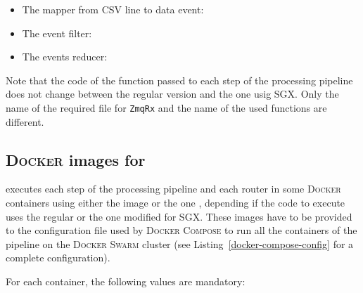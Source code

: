 \begin{itemize}[leftmargin=*]
  \item The mapper from \textsc{CSV} line to data event:
    
  \item The event filter:
    
  \item The events reducer:
    
\end{itemize}

Note that the code of the function passed to each step of the processing pipeline does not change between the regular version and the one usig SGX.
Only the name of the required file for \texttt{ZmqRx} and the name of the used functions are different.

\newpage

\subsection{\textsc{Docker} images for \SS{}}
\label{subsec:ssdockerimages}

\SS{} executes each step of the processing pipeline and each router in some \textsc{Docker} containers using either the image \dockerimagelua{} or the one \dockerimageluasgx{}, depending if the code to execute uses the regular \luavm{} or the one modified for SGX.
These images have to be provided to the configuration file used by \textsc{Docker Compose} to run all the containers of the pipeline on the \textsc{Docker Swarm} cluster (see Listing~\ref{docker-compose-config} for a complete configuration).

For each container, the following values are mandatory:

